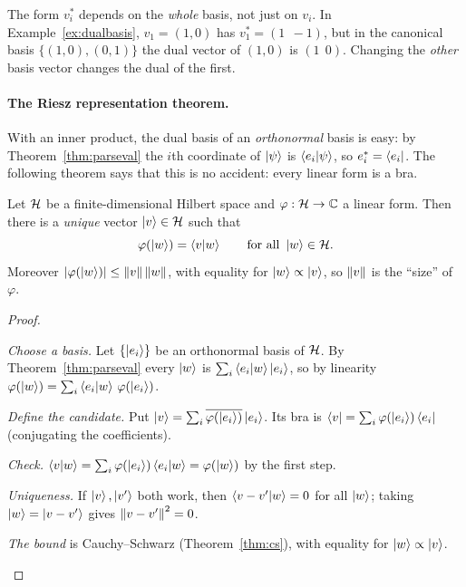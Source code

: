 \begin{pitfall}
  The form $v_i^*$ depends on the \emph{whole} basis, not just on $v_i$. In Example~\ref{ex:dualbasis}, $v_1=(1,0)$ has $v_1^*=(1\ \ -1)$, but in the canonical basis $\{(1,0),(0,1)\}$ the dual vector of $(1,0)$ is $(1\ \ 0)$. Changing the \emph{other} basis vector changes the dual of the first.
\end{pitfall}

\paragraph{The Riesz representation theorem.}
With an inner product, the dual basis of an \emph{orthonormal} basis is easy: by Theorem~\ref{thm:parseval} the $i$th coordinate of $\left|\psi\right\rangle$ is $\left\langle e_i\middle|\psi\right\rangle$, so $e_i^*=\left\langle e_i\right|$. The following theorem says that this is no accident: every linear form is a bra.

\begin{theorem}\label{thm:riesz}
  Let $\mathcal{H}$ be a finite-dimensional Hilbert space and $\varphi:\mathcal{H}\to\mathbb{C}$ a linear form. Then there is a \emph{unique} vector $\left|v\right\rangle\in\mathcal{H}$ such that
  \[
    \varphi(\left|w\right\rangle)=\left\langle v\middle|w\right\rangle\qquad\text{for all }\left|w\right\rangle\in\mathcal{H} .
  \]
  Moreover $\left|\varphi(\left|w\right\rangle)\right|\le\left\|v\right\|\left\|w\right\|$, with equality for $\left|w\right\rangle\propto\left|v\right\rangle$, so $\left\|v\right\|$ is the ``size'' of $\varphi$.
\end{theorem}
\begin{proof}
  \begin{steps}
    \item \emph{Choose a basis.} Let $\{\left|e_i\right\rangle\}$ be an orthonormal basis of $\mathcal{H}$. By Theorem~\ref{thm:parseval} every $\left|w\right\rangle$ is $\sum_i\left\langle e_i\middle|w\right\rangle\left|e_i\right\rangle$, so by linearity $\varphi(\left|w\right\rangle)=\sum_i\left\langle e_i\middle|w\right\rangle\,\varphi(\left|e_i\right\rangle)$.
    \item \emph{Define the candidate.} Put $\left|v\right\rangle=\sum_i\overline{\varphi(\left|e_i\right\rangle)}\left|e_i\right\rangle$. Its bra is $\left\langle v\right|=\sum_i\varphi(\left|e_i\right\rangle)\left\langle e_i\right|$ (conjugating the coefficients).
    \item \emph{Check.} $\left\langle v\middle|w\right\rangle=\sum_i\varphi(\left|e_i\right\rangle)\left\langle e_i\middle|w\right\rangle=\varphi(\left|w\right\rangle)$ by the first step.
    \item \emph{Uniqueness.} If $\left|v\right\rangle,\left|v'\right\rangle$ both work, then $\left\langle v-v'\middle|w\right\rangle=0$ for all $\left|w\right\rangle$; taking $\left|w\right\rangle=\left|v-v'\right\rangle$ gives $\left\|v-v'\right\|^2=0$.
    \item \emph{The bound} is Cauchy--Schwarz (Theorem~\ref{thm:cs}), with equality for $\left|w\right\rangle\propto\left|v\right\rangle$. \qedhere
  \end{steps}
\end{proof}

